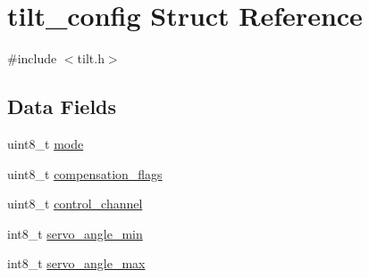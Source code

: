\hypertarget{structtilt__config}{\section{tilt\+\_\+config Struct Reference}
\label{structtilt__config}
}


{\ttfamily \#include $<$tilt.\+h$>$}

\subsection*{Data Fields}
\begin{DoxyCompactItemize}
\item 
uint8\+\_\+t \hyperlink{structtilt__config_a47e92f99902b94f3866b7d601308a3a8}{mode}
\item 
uint8\+\_\+t \hyperlink{structtilt__config_afef2faa3e927f727730fb334c41422fe}{compensation\+\_\+flags}
\item 
uint8\+\_\+t \hyperlink{structtilt__config_a994829e6ff8a985dff7855560cc5c8ba}{control\+\_\+channel}
\item 
int8\+\_\+t \hyperlink{structtilt__config_a84f6ef24e9a3dc89d00e4cfd97f343a9}{servo\+\_\+angle\+\_\+min}
\item 
int8\+\_\+t \hyperlink{structtilt__config_a49ff48fa32c93f577d7142242e301201}{servo\+\_\+angle\+\_\+max}
\end{DoxyCompactItemize}


